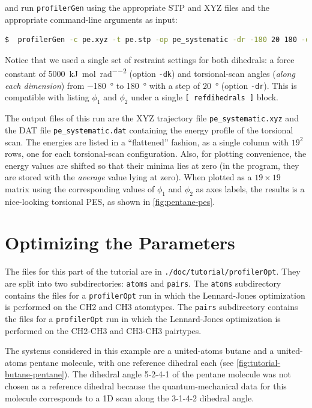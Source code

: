 \documentclass[10pt,a4paper,openany]{memoir}
\numberwithin{equation}{section}
\newcommand{\profileropt}[0]{\texttt{profilerOpt}}
\newcommand{\profilergen}[0]{\texttt{profilerGen}}
\begin{document}
\noindent
and run \profilergen{} using the appropriate STP and XYZ files and the
appropriate command-line arguments as input:

\begin{lstlisting}[language=bash]
$  profilerGen -c pe.xyz -t pe.stp -op pe_systematic -dr -180 20 180 -dk 5000
\end{lstlisting}\vspace{2ex}\par

\noindent
Notice that we used a single set of restraint settings for both
dihedrals: a force constant of
\SI{5000}{\kJ\per\mole\per\radian\squared} (option \texttt{-dk}) and
torsional-scan angles (\textit{along each dimension}) from
\SI{-180}{\degree} to \SI{180}{\degree} with a step of
\SI{20}{\degree} (option \texttt{-dr}).  This is compatible with
listing $\phi_1$ and
$\phi_2$ under a single \texttt{[~refdihedrals~]} block.

The output files of this run are the XYZ trajectory file
\texttt{pe\_systematic.xyz} and the DAT file \texttt{pe\_systematic.dat}
containing the energy profile of the torsional scan. The energies are listed in
a ``flattened'' fashion, as a single column with $19^2$ rows, one for each
torsional-scan configuration. Also, for plotting convenience, the energy values
are shifted so that their minima lies at zero (in the program, they are stored
with the \textit{average} value lying at zero).  When plotted as a $19\times 19$
matrix using the corresponding values of $\phi_1$ and $\phi_2$ as axes labels,
the results is a nice-looking torsional PES, as shown in
\autoref{fig:pentane-pes}.

\section{Optimizing the Parameters}
\label{sec:tutorial-profileropt}

The files for this part of the tutorial are in \texttt{./doc/tutorial/profilerOpt}.
They are split into two subdirectories: \texttt{atoms} and \texttt{pairs}.
The \texttt{atoms} subdirectory contains the files for a \profileropt{} run in which
the Lennard-Jones optimization is performed on the CH2 and CH3 atomtypes.
The \texttt{pairs} subdirectory contains the files for a \profileropt{} run in which
the Lennard-Jones optimization is performed on the CH2-CH3 and CH3-CH3 pairtypes.

The systems considered in this example are a united-atoms butane and a
united-atoms pentane molecule, with one reference dihedral each (see
\autoref{fig:tutorial-butane-pentane}).  The dihedral angle 5-2-4-1 of
the pentane molecule was not chosen as a reference dihedral because the
quantum-mechanical data for this molecule corresponds to a 1D scan along
the 3-1-4-2 dihedral angle.
%
\end{document}
